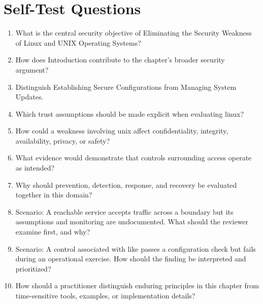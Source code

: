\documentclass[11pt]{article}
\begin{document}
\section*{Self-Test Questions}
\begin{enumerate}
\item What is the central security objective of Eliminating the Security Weakness of Linux and UNIX Operating Systems?
\item How does Introduction contribute to the chapter's broader security argument?
\item Distinguish Establishing Secure Configurations from Managing System Updates.
\item Which trust assumptions should be made explicit when evaluating linux?
\item How could a weakness involving unix affect confidentiality, integrity, availability, privacy, or safety?
\item What evidence would demonstrate that controls surrounding access operate as intended?
\item Why should prevention, detection, response, and recovery be evaluated together in this domain?
\item Scenario: A reachable service accepts traffic across a boundary but its assumptions and monitoring are undocumented. What should the reviewer examine first, and why?
\item Scenario: A control associated with like passes a configuration check but fails during an operational exercise. How should the finding be interpreted and prioritized?
\item How should a practitioner distinguish enduring principles in this chapter from time-sensitive tools, examples, or implementation details?
\end{enumerate}
\end{document}
